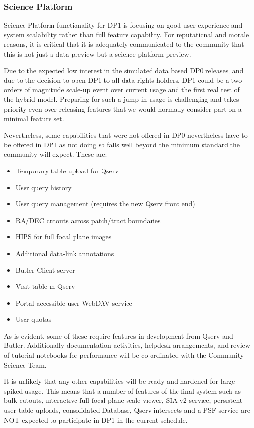 \subsubsection{Science Platform}

Science Platform functionality for DP1 is focusing on good user experience and system scalability rather than full feature capability.
For reputational and morale reasons, it is critical that it is adequately communicated to the community that this is not just a data preview but a science platform preview.

Due to the expected low interest in the simulated data based DP0 releases, and due to the decision to open DP1 to all data rights holders, DP1 could be a two orders of magnitude scale-up event over current usage and the first real test of the hybrid model. Preparing for such a jump in usage is challenging and takes priority even over releasing features that we would normally consider part on a minimal feature set.

Nevertheless, some capabilities that were not offered in DP0 nevertheless have to be offered in DP1 as not doing so falls well beyond the minimum standard the community will expect. These are:

\begin{itemize}
    \item Temporary table upload for Qserv
    \item User query history
    \item User query management (requires the new Qserv front end)
    \item RA/DEC cutouts across patch/tract boundaries
    \item HIPS for full focal plane images
    \item Additional data-link annotations
    \item Butler Client-server
    \item Visit table in Qserv
    \item Portal-accessible user WebDAV service
    \item User quotas
\end{itemize}

As is evident, some of these require features in development from Qserv and Butler. Additionally documentation activities, helpdesk arrangements, and review of tutorial notebooks for performance will be co-ordinated with the Community Science Team.

It is unlikely that any other capabilities will be ready and hardened for large spiked usage. This means that a number of features of the final system such as bulk cutouts, interactive full focal plane scale viewer, SIA v2 service, persistent user table uploads, consolidated Database, Qserv intersects and a PSF service are NOT expected to participate in DP1 in the current schedule.

